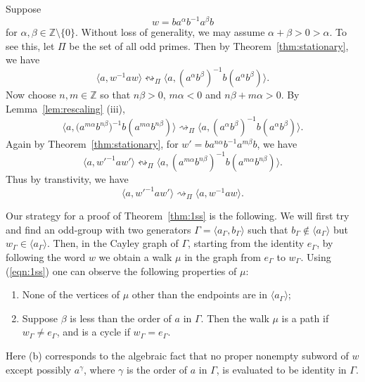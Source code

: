 \documentclass[10pt,a4paper]{amsart}
\theoremstyle{definition}
\theoremstyle{definition}
\numberwithin{equation}{section}
\begin{document}
Suppose
\begin{equation}\label{eqn:1ss} w=ba^{\alpha}b^{-1}a^{\beta}b \end{equation}
for $\alpha, \beta\in \mathbb{Z}\setminus\{0\}$. Without loss of generality, we may assume $\alpha+\beta>0>\alpha$. To see this, let $\Pi$ be the set of all odd primes. Then by Theorem~\ref{thm:stationary}, we have
$$\langle a, w^{-1}aw\rangle\leftrightsquigarrow_\Pi\big\langle a, (a^{\alpha}b^{\beta})^{-1}b(a^{\alpha}b^{\beta})\big\rangle. $$ 
Now choose $n, m\in \mathbb{Z}$ so that $n\beta>0$, $m\alpha<0$ and $n\beta+m\alpha>0$. By Lemma~\ref{lem:rescaling} (iii), 
\begin{equation} \big\langle a, \big(a^{m\alpha}b^{n\beta})^{-1}b(a^{m\alpha}b^{n\beta})\big\rangle\rightsquigarrow_\Pi\big\langle a, (a^{\alpha}b^{\beta})^{-1}b(a^{\alpha}b^{\beta})\big\rangle. \end{equation}
Again by Theorem~\ref{thm:stationary}, for $w'=ba^{n\alpha}b^{-1}a^{m\beta}b$, we have
\begin{equation}\langle a, w'^{-1}aw'\rangle\leftrightsquigarrow_\Pi\big\langle a, (a^{m\alpha}b^{n\beta})^{-1}b(a^{m\alpha}b^{n\beta})\big\rangle.
\end{equation}
Thus by transtivity, we have
$$ \langle a, w'^{-1}aw'\rangle\rightsquigarrow_\Pi \langle a, w^{-1}aw\rangle. $$

Our strategy for a proof of Theorem~\ref{thm:1ss} is the following. We will first try and find an odd-group with two generators $\Gamma=\langle a_\Gamma, b_\Gamma\rangle$ such that $b_\Gamma\not\in \langle a_\Gamma\rangle$ but $w_\Gamma\in \langle a_\Gamma\rangle$. Then, in the Cayley graph of $\Gamma$, starting from the identity $e_\Gamma$, by following the word $w$ we obtain a walk $\mu$ in the graph from $e_\Gamma$ to $w_\Gamma$. Using (\ref{eqn:1ss}) one can observe the following properties of $\mu$:
\begin{enumerate}
\item[(a)] None of the vertices of $\mu$ other than the endpoints are in $\langle a_\Gamma\rangle$;
\item[(b)] Suppose $\beta$ is less than the order of $a$ in $\Gamma$. Then the walk $\mu$ is a path if $w_\Gamma\neq e_\Gamma$, and is a cycle if $w_\Gamma=e_\Gamma$.
\end{enumerate}
Here (b) corresponds to the algebraic fact that no proper nonempty subword of $w$ except possibly $a^\gamma$, where $\gamma$ is the order of $a$ in $\Gamma$, is evaluated to be identity in $\Gamma$. 
\end{document}
